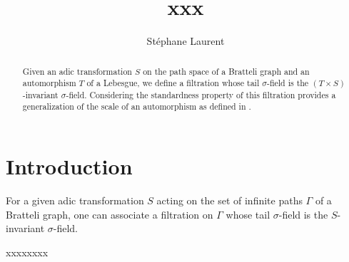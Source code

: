\documentclass[12pt,a4paper]{article}
\author{Stéphane Laurent}
\title{xxx}
\begin{document}
\theoremstyle{defstyle}
\newtheorem{definition}{Definition}
\newtheorem{remark}{Remark}
\newtheorem{question}{Question}
\newtheorem{clarify}{To clarify}
\theoremstyle{thmstyle}
\newtheorem{thm}{Theorem}[section]
\newtheorem{ppsition}{Proposition}
\newtheorem{lemma}{Lemma}

\newcommand{\BB}{\mathcal{B}}
\newcommand{\CC}{\mathcal{C}}
\newcommand{\EEE}{\mathcal{E}}
\newcommand{\FF}{\mathcal{F}}
\newcommand{\GG}{\mathcal{G}}
\newcommand{\tildGG}{\widetilde{\GG}}
\newcommand{\HH}{\mathcal{H}}
\newcommand{\EE}{\mathbb{E}}
\newcommand{\II}{\mathcal{I}}
\newcommand{\LL}{\mathcal{L}}
\newcommand{\OO}{\mathcal{O}}
\newcommand{\UU}{\mathcal{U}}
\newcommand{\XX}{\mathcal{X}}
\newcommand{\given}{\mid}
\newcommand{\eps}{\epsilon}
\newcommand{\indic}{\boldsymbol 1}
\newcommand{\Vb}{\boldsymbol V}
\newcommand{\tildV}{\widetilde{V}}
\newcommand{\tildW}{\widetilde{W}}
\newcommand{\tildX}{\widetilde{X}}
\newcommand{\tildeps}{\widetilde{\epsilon}}


\newcommand{\indvee}{\dot{\vee}}
\newcommand{\indep}{\mathrel{\text{\scalebox{1.07}{$\perp\mkern-10mu\perp$}}}}

\maketitle

\begin{abstract}
Given an adic transformation $S$ on the path space of a Bratteli graph and 
an automorphism $T$ of a Lebesgue, we define a filtration whose 
tail $\sigma$-field is the $(T \times S)$-invariant $\sigma$-field. 
Considering the standardness property of this filtration provides 
a generalization of the scale of an automorphism as defined in 
\cite{LauXLV}.
\end{abstract}

\section{Introduction} 

For a given adic transformation $S$ acting on the set of infinite paths $\Gamma$ of a 
Bratteli graph, one can associate a filtration on $\Gamma$ whose 
tail $\sigma$-field is the $S$-invariant $\sigma$-field. 

xxxxxxxx
\end{document}
